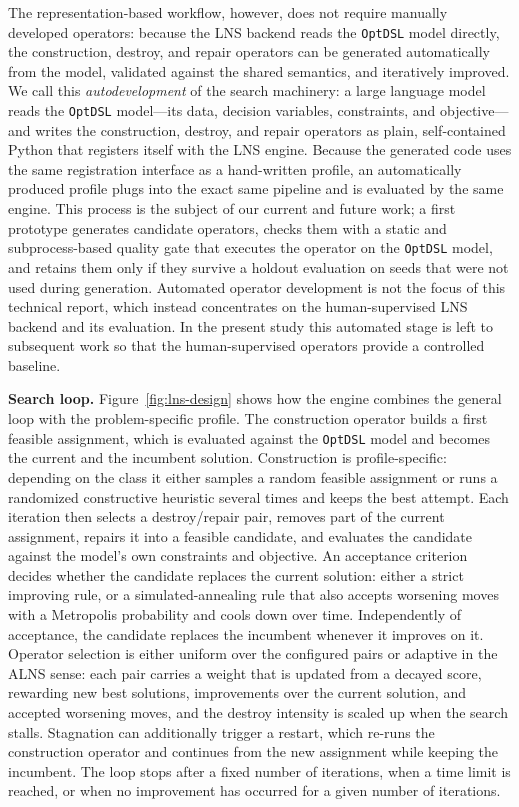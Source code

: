 \documentclass[11pt,a4paper]{article}
\begin{document}
The representation-based workflow, however, does not require manually developed operators: because the LNS backend reads the \texttt{OptDSL} model directly, the construction, destroy, and repair operators can be generated automatically from the model, validated against the shared semantics, and iteratively improved.
We call this \emph{autodevelopment} of the search machinery: a large language model reads the \texttt{OptDSL} model---its data, decision variables, constraints, and objective---and writes the construction, destroy, and repair operators as plain, self-contained Python that registers itself with the LNS engine.
Because the generated code uses the same registration interface as a hand-written profile, an automatically produced profile plugs into the exact same pipeline and is evaluated by the same engine.
This process is the subject of our current and future work; a first prototype generates candidate operators, checks them with a static and subprocess-based quality gate that executes the operator on the \texttt{OptDSL} model, and retains them only if they survive a holdout evaluation on seeds that were not used during generation.
Automated operator development is not the focus of this technical report, which instead concentrates on the human-supervised LNS backend and its evaluation.
In the present study this automated stage is left to subsequent work so that the human-supervised operators provide a controlled baseline.

\textbf{Search loop.}
Figure~\ref{fig:lns-design} shows how the engine combines the general loop with
the problem-specific profile.
The construction operator builds a first feasible assignment, which is
evaluated against the \texttt{OptDSL} model and becomes the current and the
incumbent solution.
Construction is profile-specific: depending on the class it either samples a
random feasible assignment or runs a randomized constructive heuristic several
times and keeps the best attempt.
Each iteration then selects a destroy/repair pair, removes part of the current
assignment, repairs it into a feasible candidate, and evaluates the candidate
against the model's own constraints and objective.
An acceptance criterion decides whether the candidate replaces the current
solution: either a strict improving rule, or a simulated-annealing rule that
also accepts worsening moves with a Metropolis probability and cools down over
time.
Independently of acceptance, the candidate replaces the incumbent whenever it
improves on it.
Operator selection is either uniform over the configured pairs or adaptive in
the ALNS sense: each pair carries a weight that is updated from a decayed
score, rewarding new best solutions, improvements over the current solution,
and accepted worsening moves, and the destroy intensity is scaled up when the
search stalls.
Stagnation can additionally trigger a restart, which re-runs the construction
operator and continues from the new assignment while keeping the incumbent.
The loop stops after a fixed number of iterations, when a time limit is
reached, or when no improvement has occurred for a given number of iterations.
\end{document}
